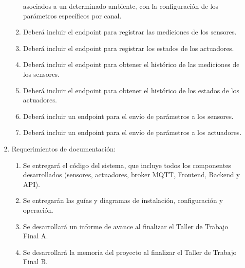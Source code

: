 \begin{enumerate}
\begin{enumerate}
		            asociados a un determinado ambiente, con la configuración de los parámetros
		            específicos por canal.
		      \item Deberá incluir el endpoint para registrar las mediciones de los sensores.
		      \item Deberá incluir el endpoint para registrar los estados de los actuadores.
		      \item Deberá incluir el endpoint para obtener el histórico de las mediciones de los
		            sensores.
		      \item Deberá incluir el endpoint para obtener el histórico de los estados de los
		            actuadores.
		      \item Deberá incluir un endpoint para el envío de parámetros a los sensores.
		      \item Deberá incluir un endpoint para el envío de parámetros a los actuadores.
	      \end{enumerate}

	\item Requerimientos de documentación:
	      \begin{enumerate}
		      \item Se entregará el código del sistema, que incluye todos los componentes
		            desarrollados (sensores, actuadores, broker MQTT, Frontend, Backend y API).
		      \item Se entregarán las guías y diagramas de instalación, configuración y operación.
		      \item Se desarrollará un informe de avance al finalizar el Taller de Trabajo Final A.
		      \item Se desarrollará la memoria del proyecto al finalizar el Taller de Trabajo Final
		            B.
	      \end{enumerate}
\end{enumerate}
